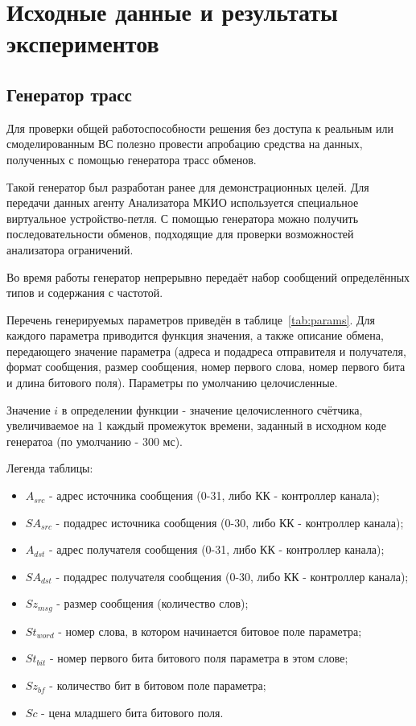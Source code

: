 \section{Исходные данные и результаты экспериментов}

\subsection*{Генератор трасс}

Для проверки общей работоспособности решения без доступа к реальным 
или смоделированным ВС полезно провести апробацию средства на данных, 
полученных с помощью генератора трасс обменов.

Такой генератор был разработан ранее для демонстрационных целей. Для 
передачи данных агенту Анализатора МКИО используется специальное виртуальное 
устройство-петля. С помощью генератора можно получить последовательности 
обменов, подходящие для проверки возможностей анализатора ограничений.

Во время работы генератор непрерывно передаёт набор сообщений определённых 
типов и содержания с  частотой. 

Перечень генерируемых параметров приведён в таблице~\ref{tab:params}. Для 
каждого параметра приводится функция значения, а также описание 
обмена, передающего значение параметра (адреса и подадреса отправителя и 
получателя, формат сообщения, размер сообщения, номер первого слова, номер 
первого бита и длина битового поля). Параметры по умолчанию целочисленные.

Значение $i$ в определении функции - значение целочисленного счётчика, 
увеличиваемое на 1 каждый промежуток времени, заданный в исходном коде 
генератоа (по умолчанию - 300 мс).

Легенда таблицы:

\begin{itemize}
 \item $A_{src}$ - адрес источника сообщения (0-31, либо КК - контроллер 
канала);
 \item $SA_{src}$ - подадрес источника сообщения (0-30, либо КК - контроллер 
канала);
 \item $A_{dst}$ - адрес получателя сообщения (0-31, либо КК - контроллер 
канала);
 \item $SA_{dst}$ - подадрес получателя сообщения (0-30, либо КК - контроллер 
канала);
 \item $Sz_{msg}$ - размер сообщения (количество слов);
 \item $St_{word}$ - номер слова, в котором начинается битовое поле параметра;
 \item $St_{bit}$ - номер первого бита битового поля параметра в этом слове;
 \item $Sz_{bf}$ - количество бит в битовом поле параметра;
 \item $Sc$ - цена младшего бита битового поля.
\end{itemize}

